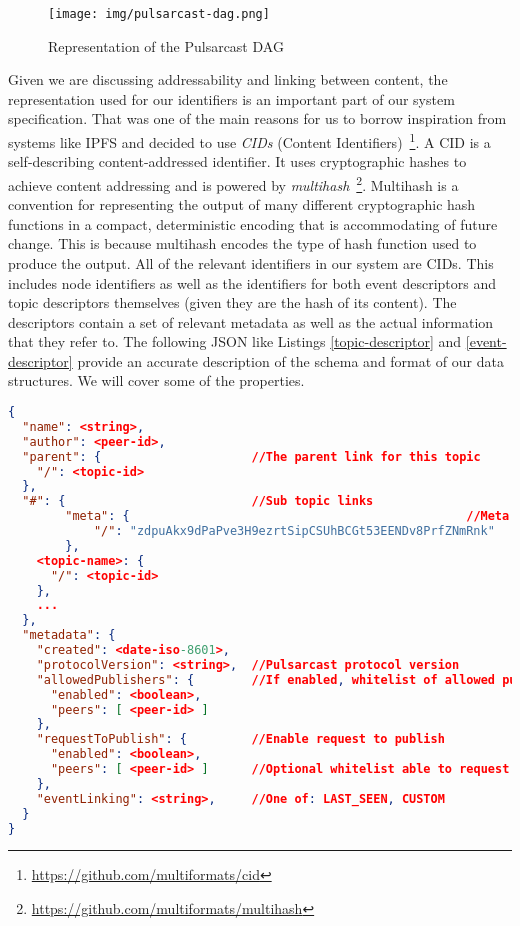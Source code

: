 \begin{figure}[hb!]
  \centering
  \texttt{[image: img/pulsarcast-dag.png]}
  \caption{Representation of the Pulsarcast DAG}
  \label{fig:pulsarcast-dag}
\end{figure}

Given we are discussing addressability and linking between content, the
representation used for our identifiers is an important part of our system
specification. That was one of the main reasons for us to borrow inspiration
from systems like IPFS and decided to use \emph{CIDs} (Content
Identifiers)~\footnote{\url{https://github.com/multiformats/cid}}.  A CID is a
self-describing content-addressed identifier. It uses cryptographic hashes to
achieve content addressing and is powered by
\emph{multihash}~\footnote{\url{https://github.com/multiformats/multihash}}.
Multihash is a convention for representing the output of many different
cryptographic hash functions in a compact, deterministic encoding that is
accommodating of future change. This is because multihash encodes the type of
hash function used to produce the output. All of the relevant identifiers in
our system are CIDs. This includes node identifiers as well as the identifiers
for both event descriptors and topic descriptors themselves (given they are the
hash of its content). The descriptors contain a set of relevant metadata as
well as the actual information that they refer to. The following JSON like
Listings \ref{topic-descriptor} and \ref{event-descriptor} provide an accurate
description of the schema and format of our data structures. We will cover some
of the properties.

\begin{lstlisting}[float, language=JSON,caption={Topic descriptor schema in a JSON based format},label={topic-descriptor}]
{
  "name": <string>,
  "author": <peer-id>,
  "parent": {                     //The parent link for this topic
    "/": <topic-id>
  },
  "#": {                          //Sub topic links
		"meta": {												//Meta topic
			"/": "zdpuAkx9dPaPve3H9ezrtSipCSUhBCGt53EENDv8PrfZNmRnk"
		},
    <topic-name>: {
      "/": <topic-id>
    },
    ...
  },
  "metadata": {
    "created": <date-iso-8601>,
    "protocolVersion": <string>,  //Pulsarcast protocol version
    "allowedPublishers": {        //If enabled, whitelist of allowed publishers
      "enabled": <boolean>,
      "peers": [ <peer-id> ]
    },
    "requestToPublish": {         //Enable request to publish
      "enabled": <boolean>,
      "peers": [ <peer-id> ]      //Optional whitelist able to request
    },
    "eventLinking": <string>,     //One of: LAST_SEEN, CUSTOM
  }
}
\end{lstlisting}

